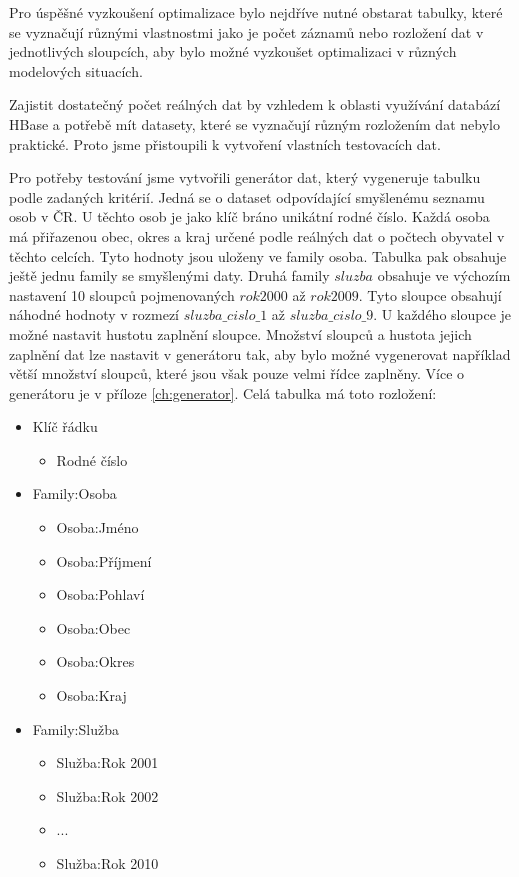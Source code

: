 \documentclass[thesis=M,czech]{FITthesis}[2012/06/26]
\begin{document}
Pro úspěšné vyzkoušení optimalizace bylo nejdříve nutné obstarat tabulky, které se vyznačují různými vlastnostmi jako je počet záznamů nebo rozložení dat v jednotlivých sloupcích, aby bylo možné vyzkoušet optimalizaci v různých modelových situacích.

Zajistit dostatečný počet reálných dat by vzhledem k oblasti využívání databází HBase a potřebě mít datasety, které se vyznačují různým rozložením dat nebylo praktické. Proto jsme přistoupili k vytvoření vlastních testovacích dat. 

Pro potřeby testování jsme vytvořili generátor dat, který vygeneruje tabulku podle zadaných kritérií. Jedná se o dataset odpovídající smyšlenému seznamu osob v ČR. U těchto osob je jako klíč bráno unikátní rodné číslo. Každá osoba má přiřazenou obec, okres a kraj určené podle reálných dat o počtech obyvatel v těchto celcích. Tyto hodnoty jsou uloženy ve family osoba. Tabulka pak obsahuje ještě jednu family se smyšlenými daty. Druhá family $sluzba$ obsahuje ve výchozím nastavení 10 sloupců pojmenovaných $rok2000$ až $rok2009$. Tyto sloupce obsahují náhodné hodnoty v rozmezí $sluzba\_cislo\_1$ až $sluzba\_cislo\_9$. U každého sloupce je možné nastavit hustotu zaplnění sloupce. Množství sloupců a hustota jejich zaplnění dat lze nastavit v generátoru tak, aby bylo možné vygenerovat například větší množství sloupců, které jsou však pouze velmi řídce zaplněny. Více o generátoru je v příloze \ref{ch:generator}. Celá tabulka má toto rozložení:


\begin{itemize}
\item Klíč řádku
\begin{itemize}
\item Rodné číslo
\end{itemize}
\item Family:Osoba
\begin{itemize}
\item Osoba:Jméno
\item Osoba:Příjmení
\item Osoba:Pohlaví
\item Osoba:Obec
\item Osoba:Okres
\item Osoba:Kraj
\end{itemize}
\item Family:Služba
\begin{itemize}
\item Služba:Rok 2001
\item Služba:Rok 2002
\item ...
\item Služba:Rok 2010
\end{itemize}
\end{itemize}
\end{document}
